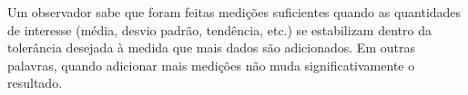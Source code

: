 Um observador sabe que foram feitas medições suficientes quando as quantidades de interesse (média, desvio padrão, tendência, etc.) se estabilizam dentro da tolerância desejada à medida que mais dados são adicionados. Em outras palavras, quando adicionar mais medições não muda significativamente o resultado. 